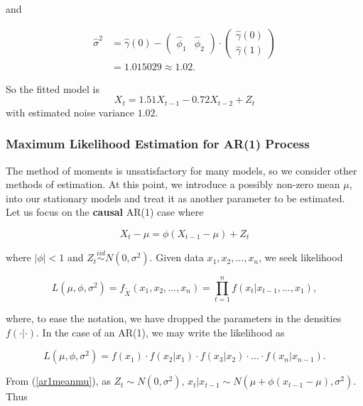 \documentclass[11pt, a4paper]{article}
\numberwithin{equation}{section}
\theoremstyle{definition}
\begin{document}
and

\begin{align*}
\hat{\sigma}^2 &= \hat{\gamma}(0) - \begin{pmatrix}
\hat{\phi}_1 & \hat{\phi}_2
\end{pmatrix} \cdot \begin{pmatrix}
\hat{\gamma}(0) \\ \hat{\gamma}(1)
\end{pmatrix} \\[0.2em]
&= 1.015029 \approx 1.02.
\end{align*}

So the fitted model is
$$X_t = 1.51X_{t-1} - 0.72X_{t-2} + Z_t$$
with estimated noise variance $1.02$.


\subsubsection{Maximum Likelihood Estimation for AR(1) Process}

The method of moments is unsatisfactory for many models, so we consider other methods of estimation. At this point, we introduce a possibly non-zero mean $\mu$, into our stationary models and treat it as another parameter to be estimated. \\[0.1em]

Let us focus on the \textbf{causal} AR(1) case where

\begin{equation}\label{ar1meanmu}
X_t -  \mu = \phi( X_{t-1} - \mu) + Z_t
\end{equation}

where $|\phi| < 1$ and $Z_t \overset{iid}{\sim} N(0, \sigma^2)$. Given data $x_1, x_2, \ldots, x_n$, we seek likelihood

\begin{equation}
L(\mu, \phi, \sigma^2) = f_{\utilde{X}} (x_1, x_2, \ldots, x_n) = \prod \limits_{t = 1}^{n} f(x_t | x_{t-1}, \ldots, x_1),
\end{equation}

where, to ease the notation, we have dropped the parameters in the densities $f(\cdot | \cdot)$. In the case of an AR(1), we may write the likelihood as

\begin{equation}
L(\mu, \phi, \sigma^2) = f(x_1) \cdot f(x_2 | x_1) \cdot f(x_3 | x_2) \cdot \ldots \cdot f(x_n | x_{n-1}).
\end{equation}

From (\ref{ar1meanmu}), as $Z_t \sim N(0, \sigma^2)$, $x_t | x_{t-1} \sim N(\mu + \phi(x_{t-1} - \mu), \sigma^2)$. Thus
\end{document}
